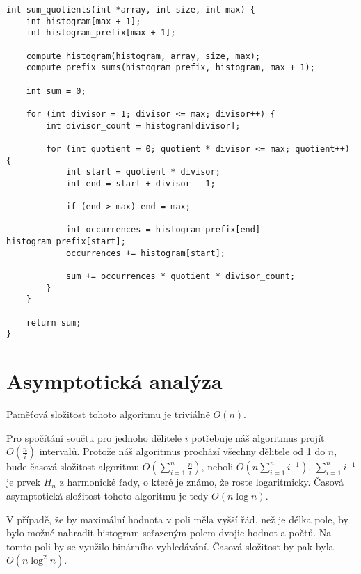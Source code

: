 \documentclass{article}
\begin{document}
\begin{verbatim}
int sum_quotients(int *array, int size, int max) {
    int histogram[max + 1];
    int histogram_prefix[max + 1];

    compute_histogram(histogram, array, size, max);
    compute_prefix_sums(histogram_prefix, histogram, max + 1);
    
    int sum = 0;

    for (int divisor = 1; divisor <= max; divisor++) {
        int divisor_count = histogram[divisor];

        for (int quotient = 0; quotient * divisor <= max; quotient++) {
            int start = quotient * divisor;
            int end = start + divisor - 1;

            if (end > max) end = max;

            int occurrences = histogram_prefix[end] - histogram_prefix[start];
            occurrences += histogram[start];

            sum += occurrences * quotient * divisor_count;
        }
    }

    return sum;
}
\end{verbatim}

\section{Asymptotická analýza}

Paměťová složitost tohoto algoritmu je triviálně \(O\left(n\right)\).

Pro spočítání součtu pro jednoho dělitele \(i\) potřebuje náš algoritmus projít \(O\left(\frac{n}{i}\right)\) intervalů. Protože náš algoritmus prochází všechny dělitele od 1 do \(n\), bude časová složitost algoritmu \(O\left(\sum_{i=1}^{n} \frac{n}{i}\right)\), neboli \(O\left(n \sum_{i=1}^{n} i^{-1}\right)\). \(\sum_{i=1}^{n} i^{-1}\) je prvek \(H_n\) z harmonické řady, o které je známo, že roste logaritmicky. Časová asymptotická složitost tohoto algoritmu je tedy \(O\left(n \log n\right)\).

V případě, že by maximální hodnota v poli měla vyšší řád, než je délka pole, by bylo možné nahradit histogram seřazeným polem dvojic hodnot a počtů. Na tomto poli by se využilo binárního vyhledávání. Časová složitost by pak byla \(O\left(n \log^2 n\right)\).
\end{document}
